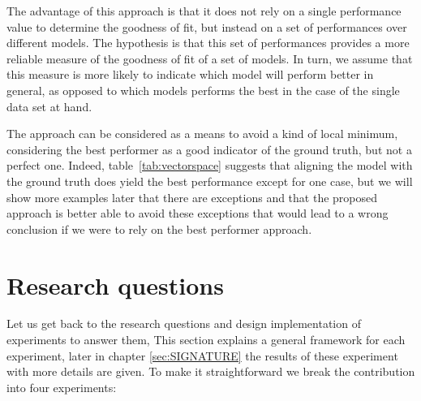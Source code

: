The advantage of this approach is that it does not rely on a single performance value to determine the goodness of fit, but instead on a set of performances over different models. The hypothesis is that this set of performances provides a more reliable measure of the goodness of fit of a set of models. In turn, we assume that this measure is more likely to indicate which model will perform better in general, as opposed to which models performs the best in the case of the single data set at hand.

The approach can be considered as a means to avoid a kind of local minimum, considering the best performer as a good indicator of the ground truth, but not a perfect one. Indeed, table~\ref{tab:vectorspace} suggests that aligning the model with the ground truth does yield the best performance except for one case, but we will show more examples later that there are exceptions and that the proposed approach is better able to avoid these exceptions that would lead to a wrong conclusion if we were to rely on the best performer approach.

\section{Research questions}

Let us get back to the research questions and design implementation of experiments to answer them, This section explains a general framework for each experiment, later in chapter \ref{sec:SIGNATURE} the results of these experiment with more details are given. To make it straightforward we break the contribution into four experiments:


